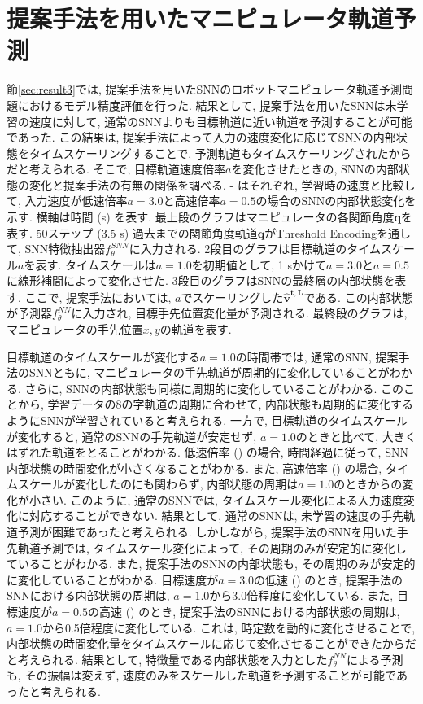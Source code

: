 \section{提案手法を用いたマニピュレータ軌道予測}

節\ref{sec:result3}では, 提案手法を用いたSNNのロボットマニピュレータ軌道予測問題におけるモデル精度評価を行った.
結果として, 提案手法を用いたSNNは未学習の速度に対して, 通常のSNNよりも目標軌道に近い軌道を予測することが可能であった.
この結果は, 提案手法によって入力の速度変化に応じてSNNの内部状態をタイムスケーリングすることで, 予測軌道もタイムスケーリングされたからだと考えられる.
そこで, 目標軌道速度倍率$a$を変化させたときの, SNNの内部状態の変化と提案手法の有無の関係を調べる.
 - はそれぞれ, 学習時の速度と比較して, 入力速度が低速倍率$a=3.0$と高速倍率$a=0.5$の場合のSNNの内部状態変化を示す.
横軸は時間 (s) を表す.
最上段のグラフはマニピュレータの各関節角度$\bm{q}$を表す.
50ステップ (3.5 s) 過去までの関節角度軌道$\bm{q}$がThreshold Encodingを通して, SNN特徴抽出器$f^{SNN}_\theta$に入力される.
2段目のグラフは目標軌道のタイムスケール$a$を表す.
タイムスケールは$a=1.0$を初期値として, 1 sかけて$a=3.0$と$a=0.5$に線形補間によって変化させた.
3段目のグラフはSNNの最終層の内部状態を表す.
ここで, 提案手法においては, $a$でスケーリングした$\bm{\hat{v}^{t,L}}$である.
この内部状態が予測器$f^{NN}_\theta$に入力され, 目標手先位置変化量が予測される.
最終段のグラフは, マニピュレータの手先位置$x,y$の軌道を表す.

目標軌道のタイムスケールが変化する$a=1.0$の時間帯では, 通常のSNN, 提案手法のSNNともに, マニピュレータの手先軌道が周期的に変化していることがわかる.
さらに, SNNの内部状態も同様に周期的に変化していることがわかる.
このことから, 学習データの8の字軌道の周期に合わせて, 内部状態も周期的に変化するようにSNNが学習されていると考えられる.
一方で, 目標軌道のタイムスケールが変化すると, 通常のSNNの手先軌道が安定せず, $a=1.0$のときと比べて, 大きくはずれた軌道をとることがわかる.
低速倍率 () の場合, 時間経過に従って, SNN内部状態の時間変化が小さくなることがわかる.
また, 高速倍率 () の場合, タイムスケールが変化したのにも関わらず, 内部状態の周期は$a=1.0$のときからの変化が小さい.
このように, 通常のSNNでは, タイムスケール変化による入力速度変化に対応することができない.
結果として, 通常のSNNは, 未学習の速度の手先軌道予測が困難であったと考えられる.
しかしながら, 提案手法のSNNを用いた手先軌道予測では, タイムスケール変化によって, その周期のみが安定的に変化していることがわかる.
また, 提案手法のSNNの内部状態も, その周期のみが安定的に変化していることがわかる.
目標速度が$a=3.0$の低速 () のとき, 提案手法のSNNにおける内部状態の周期は, $a=1.0$から3.0倍程度に変化している.
また, 目標速度が$a=0.5$の高速 () のとき, 提案手法のSNNにおける内部状態の周期は, $a=1.0$から0.5倍程度に変化している.
これは, 時定数を動的に変化させることで, 内部状態の時間変化量をタイムスケールに応じて変化させることができたからだと考えられる.
結果として, 特徴量である内部状態を入力とした$f^{NN}_\theta$による予測も, その振幅は変えず, 速度のみをスケールした軌道を予測することが可能であったと考えられる.


